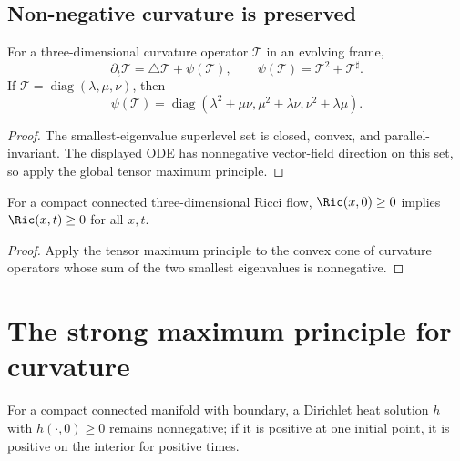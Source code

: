 \subsection{Non-negative curvature is preserved}

\begin{lemma}
\label{lem:curvature-operator-ode-dimension-three}
\label{quad}
For a three-dimensional curvature operator ${\mathcal T}$ in an evolving
frame,
\[
\partial_t{\mathcal T}=\triangle{\mathcal T}+\psi({\mathcal T}),
\qquad \psi({\mathcal T})={\mathcal T}^2+{\mathcal T}^{\sharp}.
\]
If ${\mathcal T}=\operatorname{diag}(\lambda,\mu,\nu)$, then
\[
\psi({\mathcal T})=\operatorname{diag}(\lambda^2+\mu\nu,
\mu^2+\lambda\nu,\nu^2+\lambda\mu).
\]
\end{lemma}

\begin{proof}
\sketch The smallest-eigenvalue superlevel set is closed, convex, and
parallel-invariant. The displayed ODE has nonnegative vector-field direction
on this set, so apply the global tensor maximum principle.
\end{proof}

\begin{corollary}
\label{cor:nonnegative-ricci-preserved}
\label{Ric>0}
For a compact connected three-dimensional Ricci flow, $\Ric(x,0)$ implies
$\Ric(x,t)$ for all $x,t$.
\end{corollary}
\begin{proof}
\sketch Apply the tensor maximum principle to the convex cone of curvature
operators whose sum of the two smallest eigenvalues is nonnegative.
\end{proof}

\section{The strong maximum principle for curvature}
\begin{theorem}
\label{thm:strong-maximum-principle-heat}\label{SMPheat}
For a compact connected manifold with boundary, a Dirichlet heat solution
$h$ with $h(\cdot,0)$ remains nonnegative; if it is positive at one
initial point, it is positive on the interior for positive times.
\end{theorem}

